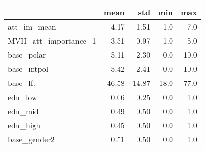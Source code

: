 \begin{tabular}{lrrrr}
\toprule
{} &   mean &    std &   min &   max \\
\midrule
att\_im\_mean          &   4.17 &   1.51 &   1.0 &   7.0 \\
MVH\_att\_importance\_1 &   3.31 &   0.97 &   1.0 &   5.0 \\
base\_polar           &   5.11 &   2.30 &   0.0 &  10.0 \\
base\_intpol          &   5.42 &   2.41 &   0.0 &  10.0 \\
base\_lft             &  46.58 &  14.87 &  18.0 &  77.0 \\
edu\_low              &   0.06 &   0.25 &   0.0 &   1.0 \\
edu\_mid              &   0.49 &   0.50 &   0.0 &   1.0 \\
edu\_high             &   0.45 &   0.50 &   0.0 &   1.0 \\
base\_gender2         &   0.51 &   0.50 &   0.0 &   1.0 \\
\bottomrule
\end{tabular}
